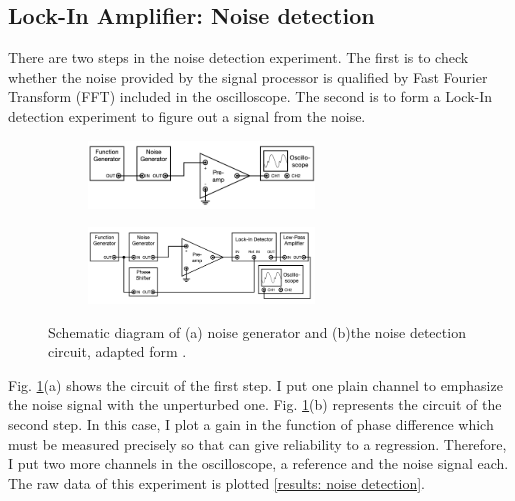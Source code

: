 \documentclass{article}
\begin{document}
 \subsection{Lock-In Amplifier: Noise detection}
 There are two steps in the noise detection experiment.
 The first is to check whether the noise provided by the signal processor is qualified by Fast Fourier Transform (FFT) included in the oscilloscope.
 The second is to form a Lock-In detection experiment to figure out a signal from the noise.
 \begin{figure}[ht]
    \centering
    \begin{subfigure}[b]{6cm}
        \centering
        \includegraphics[width=6cm]{../results/noise_circuit.png}
        \caption{}
    \end{subfigure}
    \hfill
    \begin{subfigure}[b]{6cm}
        \centering
        \includegraphics[width=6cm]{../results/noise_detection_circuit.png}
        \caption{}
    \end{subfigure}
    \hfill
    \caption{Schematic diagram of (a) noise generator and (b)the noise detection circuit, adapted form  \cite{signal_processor}.}
    \label{fig: noise detection}
  \end{figure}
 Fig. \ref{fig: noise detection}(a) shows the circuit of the first step.
 I put one plain channel to emphasize the noise signal with the unperturbed one.
 Fig. \ref{fig: noise detection}(b) represents the circuit of the second step.
 In this case, I plot a gain in the function of phase difference which must be measured precisely so that can give reliability to a regression.
 Therefore, I put two more channels in the oscilloscope, a reference and the noise signal each.
 The raw data of this experiment is plotted \ref{results: noise detection}.
\end{document}
